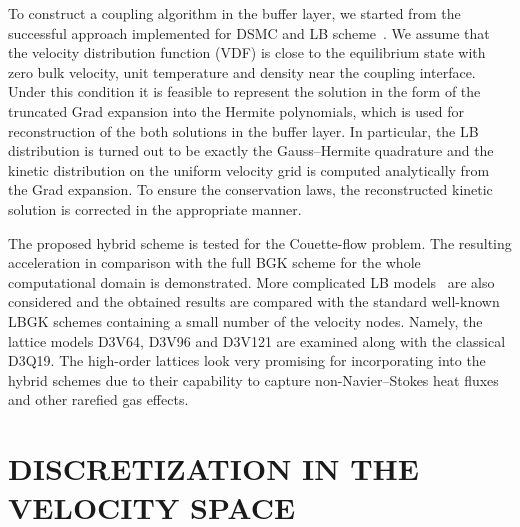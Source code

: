 \documentclass{aip-cp}
\begin{document}
To construct a coupling algorithm in the buffer layer,
we started from the successful approach implemented for DSMC and LB scheme~\cite{Staso2016long}.
We assume that the velocity distribution function (VDF) is close to the equilibrium state with zero
bulk velocity, unit temperature and density near the coupling interface.
Under this condition it is feasible to represent the solution in the form of the truncated Grad expansion into the Hermite polynomials,
which is used for reconstruction of the both solutions in the buffer layer.
In particular, the LB distribution is turned out to be exactly the Gauss--Hermite quadrature
and the kinetic distribution on the uniform velocity grid is computed analytically from the Grad expansion.
To ensure the conservation laws, the reconstructed kinetic solution is corrected in the appropriate manner.

The proposed hybrid scheme is tested for the Couette-flow problem.
The resulting acceleration in comparison with the full BGK scheme for the whole computational domain is demonstrated.
More complicated LB models~\cite{Feuchter2016} are also considered
and the obtained results are compared with the standard well-known LBGK schemes containing a small number of the velocity nodes.
Namely, the lattice models D3V64, D3V96 and D3V121 are examined along with the classical D3Q19.
The high-order lattices look very promising for incorporating into the hybrid schemes due
to their capability to capture non-Navier--Stokes heat fluxes and other rarefied gas effects.

\section{DISCRETIZATION IN THE VELOCITY SPACE}\label{sec:discretization}
\end{document}
